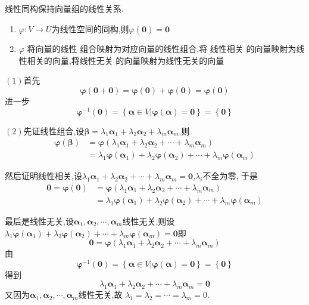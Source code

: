 \begin{formal}
\begin{theorem}[线性同构之间线性结构的相同]\label{thm:线性同构之间线性结构的相同}
    线性同构保持向量组的线性关系.

    \begin{enumerate}[label=\textup{(\arabic*)}]
        \item $\varphi :V \longrightarrow 
        U$为线性空间的同构,则$
        \varphi \left(\bm{0}\right)
        = \bm{0}$
        \item $\varphi$ 将向量的线性
        组合映射为对应向量的线性组合,将
        线性相关
        的向量映射为线性相关的向量,将线性无关
        的向量映射为线性无关的向量
    \end{enumerate}
\end{theorem}
\begin{Proof}

$(1)$首先
\[
\bm{\varphi}\left(\bm{0}+\bm{0}\right)=\bm{\varphi}\left(\bm{0}\right)+\bm{\varphi}\left(
    \bm{0}\right)=\bm{\varphi}\left(\bm{0}\right)
\]
进一步
\[
\bm{\varphi}^{-1}\left(\bm{0}\right)=
\left\{\bm{\alpha}\in V\big| \bm{\varphi}\left(\bm{\alpha}\right)=\bm{0}\right\}
=\left\{\bm{0}\right\}
\]

$(2)$先证线性组合,设$\bm{\beta}=\lambda_1\bm{\alpha}_1+\lambda_2\bm{\alpha}_2+\lambda_m\bm{\alpha}_m$,则
\begin{align*}
    \bm{\varphi}\left(\bm{\beta}\right)&=\bm{\varphi}\left(\lambda_1\bm{\alpha}_1+\lambda_2\bm{\alpha}_2+\cdots+\lambda_m\bm{\alpha}_m\right)\\
    &=\lambda_1\bm{\varphi}\left(\bm{\alpha}_1\right)+\lambda_2\bm{\varphi}\left(\bm{\alpha}_2\right)+\cdots+\lambda_m\bm{\varphi}\left(
        \bm{\alpha}_m\right)
\end{align*}

然后证明线性相关,设$\lambda_1\bm{\alpha}_1+\lambda_2\bm{\alpha}_2+\cdots+\lambda_m\bm{\alpha}_m=\bm{0}$,$\lambda_i$不全为零,
于是
\begin{align*}
    \bm{0}=\bm{\varphi}\left(\bm{0}\right)&=\bm{\varphi}\left(\lambda_1\bm{\alpha}_1+\lambda_2\bm{\alpha}_2+\cdots+\lambda_m\bm{\alpha}_m\right)\\
    &=\lambda_1\bm{\varphi}\left(\bm{\alpha}_1\right)+\lambda_2\bm{\varphi}\left(\bm{\alpha}_2\right)+\cdots+\lambda_m\bm{\varphi}\left(\bm{\alpha}_m
    \right)
\end{align*}

最后是线性无关,设$\bm{\alpha}_1,\bm{\alpha}_2,\cdots,\bm{\alpha}_m$线性无关,则设
$\lambda_1\bm{\varphi}\left(\bm{\alpha}_1\right)+\lambda_2\bm{\varphi}\left(\bm{\alpha}_2\right)+\cdots+\lambda_m\bm{\varphi}\left(\bm{\alpha}_m
    \right)=\bm{0}$即
    \[
    \bm{0}=\bm{\varphi}\left(\lambda_1\bm{\alpha}_1+\lambda_2\bm{\alpha}_2+\cdots
    +\lambda_m\bm{\alpha}_m\right)
    \]
    由\[
\bm{\varphi}^{-1}\left(\bm{0}\right)=
\left\{\bm{\alpha}\in V\big| \bm{\varphi}\left(\bm{\alpha}\right)=\bm{0}\right\}
=\left\{\bm{0}\right\}
\]
得到
\[
\lambda_1\bm{\alpha}_1+\lambda_2\bm{\alpha}_2+\cdots
    +\lambda_m\bm{\alpha}_m=\bm{0}
\]
又因为$\bm{\alpha}_1,\bm{\alpha}_2,\cdots,\bm{\alpha}_m$线性无关,故
$\lambda_1=\lambda_2=\cdots=\lambda_m=0.$


\end{Proof}
\end{formal}
